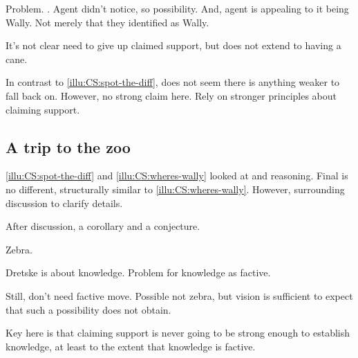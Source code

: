 \begin{note}
  Problem.
  \requ{}.
  Agent didn't notice, so possibility.
  And, agent is appealing to it being Wally.
  Not merely that they identified as Wally.

  It's not clear need to give up claimed support, but does not extend to having a cane.

  In contrast to \ref{illu:CS:spot-the-diff}, does not seem there is anything weaker to fall back on.
  However, no strong claim here.
  Rely on stronger principles about claiming support.
\end{note}

\subsection{A trip to the zoo}

\begin{note}
   \ref{illu:CS:spot-the-diff} and \ref{illu:CS:wheres-wally} looked at  and reasoning.
  Final  is no different, structurally similar to \autoref{illu:CS:wheres-wally}.
  However, surrounding discussion to clarify details.

  After discussion, a corollary and a conjecture.
\end{note}

\begin{note}
  Zebra.

  Dretske is about knowledge.
  Problem for knowledge as factive.

  Still, don't need factive move.
  Possible not zebra, but vision is sufficient to expect that such a possibility does not obtain.

  Key here is that claiming support is never going to be strong enough to establish knowledge, at least to the extent that knowledge is factive.
\end{note}

